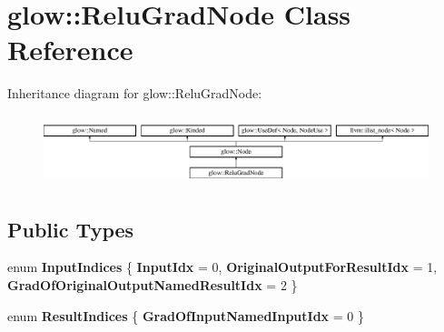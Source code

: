 \hypertarget{classglow_1_1_relu_grad_node}{}\section{glow\+:\+:Relu\+Grad\+Node Class Reference}
\label{classglow_1_1_relu_grad_node}
Inheritance diagram for glow\+:\+:Relu\+Grad\+Node\+:\begin{figure}[H]
\begin{center}
\leavevmode
\includegraphics[height=2.028986cm]{classglow_1_1_relu_grad_node}
\end{center}
\end{figure}
\subsection*{Public Types}
\begin{DoxyCompactItemize}
\item 
\mbox{\label{classglow_1_1_relu_grad_node_ada9f7b8ce98f2dbb9480848df44e2097}} 
enum {\bfseries Input\+Indices} \{ {\bfseries Input\+Idx} = 0, 
{\bfseries Original\+Output\+For\+Result\+Idx} = 1, 
{\bfseries Grad\+Of\+Original\+Output\+Named\+Result\+Idx} = 2
 \}
\item 
\mbox{\label{classglow_1_1_relu_grad_node_a617179d6e29b6c2e446bb6cfd5b795c1}} 
enum {\bfseries Result\+Indices} \{ {\bfseries Grad\+Of\+Input\+Named\+Input\+Idx} = 0
 \}
\end{DoxyCompactItemize}
